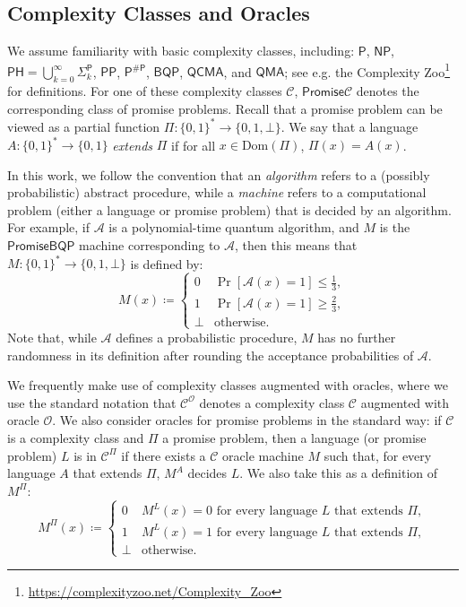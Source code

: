 \documentclass[10pt,a4paper]{article}
\newcommand{\Dom}{\mathrm{Dom}}
\begin{document}
\subsection{Complexity Classes and Oracles}
\label{sec:complexity_classes}
We assume familiarity with basic complexity classes, including: $\mathsf{P}$, $\mathsf{NP}$, $\mathsf{PH} = \bigcup_{k=0}^\infty \mathsf{\Sigma}_k^\mathsf{P}$, $\mathsf{PP}$, $\mathsf{P}^{\mathsf{\# P}}$, $\mathsf{BQP}$, $\mathsf{QCMA}$, and $\mathsf{QMA}$; see e.g. the Complexity Zoo\footnote{\url{https://complexityzoo.net/Complexity_Zoo}} for definitions. For one of these complexity classes $\mathcal{C}$, $\mathsf{Promise}\mathcal{C}$ denotes the corresponding class of promise problems. Recall that a promise problem can be viewed as a partial function $\Pi: \{0,1\}^* \to \{0,1,\bot\}$. We say that a language $A: \{0,1\}^* \to \{0,1\}$ \textit{extends} $\Pi$ if for all $x \in \Dom(\Pi)$, $\Pi(x) = A(x)$.

In this work, we follow the convention that an \textit{algorithm} refers to a (possibly probabilistic) abstract procedure, while a \textit{machine} refers to a computational problem (either a language or promise problem) that is decided by an algorithm. For example, if $\mathcal{A}$ is a polynomial-time quantum algorithm, and $M$ is the $\mathsf{PromiseBQP}$ machine corresponding to $\mathcal{A}$, then this means that $M: \{0,1\}^* \to \{0,1,\bot\}$ is defined by:
\[
M(x) \coloneqq \begin{cases}
0 & \Pr[\mathcal{A}(x) = 1] \le \frac{1}{3},\\
1 & \Pr[\mathcal{A}(x) = 1] \ge \frac{2}{3},\\
\bot & \text{otherwise}.
\end{cases}
\]
Note that, while $\mathcal{A}$ defines a probabilistic procedure, $M$ has no further randomness in its definition after rounding the acceptance probabilities of $\mathcal{A}$.

We frequently make use of complexity classes augmented with oracles, where we use the standard notation that $\mathcal{C}^\mathcal{O}$ denotes a complexity class $\mathcal{C}$ augmented with oracle $\mathcal{O}$. We also consider oracles for promise problems in the standard way: if $\mathcal{C}$ is a complexity class and $\Pi$ a promise problem, then a language (or promise problem) $L$ is in $\mathcal{C}^\Pi$ if there exists a $\mathcal{C}$ oracle machine $M$ such that, for every language $A$ that extends $\Pi$, $M^A$ decides $L$. We also take this as a definition of $M^\Pi$:
\[
M^\Pi(x) \coloneqq \begin{cases}
0 & M^L(x) = 0 \text{ for every language } L \text{ that extends } \Pi,\\
1 & M^L(x) = 1 \text{ for every language } L \text{ that extends } \Pi,\\
\bot & \text{otherwise}.
\end{cases}
\]
\end{document}
